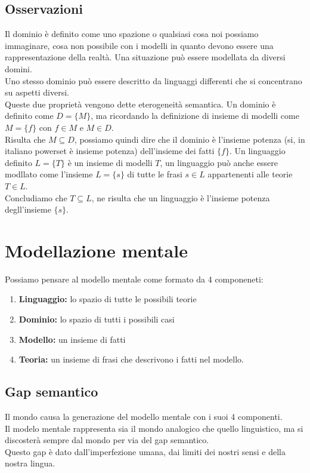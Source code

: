 \documentclass{book}
\newcommand{\spazio}{\vspace{1em} \newline}
\begin{document}
    \subsection{Osservazioni}
    Il dominio è definito come uno spazione o qualsiasi cosa noi possiamo immaginare, cosa non possibile con i modelli in quanto devono essere una rappresentazione della realtà.
    \spazio
    Una situazione può essere modellata da diversi domini.\\
    Uno stesso dominio può essere descritto da linguaggi differenti che si concentrano su aspetti diversi.\\
    Queste due proprietà vengono dette eterogeneità semantica.
    \spazio
    Un dominio è definito come $D=\{M\}$, ma ricordando la definizione di insieme di modelli come $M=\{f\}$ con $f \in M$ e $M \in D$.\\
    Risulta che $M \subseteq D$, possiamo quindi dire che il dominio è l'insieme potenza (si, in italiano powerset è insieme potenza) dell'insieme dei fatti $\{f\}$.
    \spazio
    Un linguaggio definito $L=\{T\}$ è un insieme di modelli $T$, un linguaggio può anche essere modllato come l'insieme $L=\{s\}$ di tutte le frasi $s \in L$ appartenenti alle teorie $T \in L$.\\
    Concludiamo che $T \subseteq L$, ne risulta che un linguaggio è l'insieme potenza degll'insieme $\{s\}$.

    \section{Modellazione mentale}
    Possiamo pensare al modello mentale come formato da 4 componeneti:
    \begin{enumerate}
        \item \textbf{Linguaggio:} lo spazio di tutte le possibili teorie
        \item \textbf{Dominio:} lo spazio di tutti i possibili casi
        \item \textbf{Modello:} un insieme di fatti
        \item \textbf{Teoria:} un insieme di frasi che descrivono i fatti nel modello.
    \end{enumerate}

    \subsection{Gap semantico}
    Il mondo causa la generazione del modello mentale con i suoi 4 componenti.\\
    Il modelo mentale rappresenta sia il mondo analogico che quello linguistico, ma si discosterà sempre dal mondo per via del gap semantico.\\
    Questo gap è dato dall'imperfezione umana, dai limiti dei nostri sensi e della nostra lingua.
\end{document}
